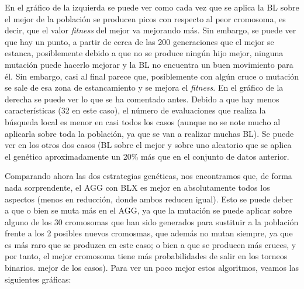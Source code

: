 \documentclass[11pt,a4paper]{article}
\begin{document}
En el gráfico de la izquierda se puede ver como cada vez que se aplica la BL sobre el mejor de la población se producen picos
con respecto al peor cromosoma, es decir, que el valor \textit{fitness} del mejor va mejorando más. Sin embargo, se puede ver
que hay un punto, a partir de cerca de las 200 generaciones que el mejor se estanca, posiblemente debido a que no se produce
ningún hijo mejor, ninguna mutación puede hacerlo mejorar y la BL no encuentra un buen movimiento para él. Sin embargo, casi al
final parece que, posiblemente con algún cruce o mutación se sale de esa zona de estancamiento y se mejora el \textit{fitness}.
En el gráfico de la derecha se puede ver lo que se ha comentado antes. Debido a que hay menos características (32 en este caso),
el número de evaluaciones que realiza la búsqueda local es menor en casi todos los casos (aunque no se note mucho al aplicarla
sobre toda la población, ya que se van a realizar muchas BL). Se puede ver en los otros dos casos (BL sobre el mejor y sobre uno
aleatorio que se aplica el genético aproximadamente un 20\% más que en el conjunto de datos anterior.

Comparando ahora las dos estrategias genéticas, nos encontramos que, de forma nada sorprendente, el AGG con BLX es mejor en
absolutamente todos los aspectos (menos en reducción, donde ambos reducen igual). Esto se puede deber a que o bien se muta más en
el AGG, ya que la mutación se puede aplicar sobre alguno de los 30 cromosomas que han sido generados para sustituir a la población
frente a los 2 posibles nuevos cromosmas, que además no mutan siempre, ya que es más raro que se produzca en este caso; o bien a
que se producen más cruces, y por tanto, el mejor cromosoma tiene más probabilidades de salir en los torneos binarios.
mejor de los casos). Para ver un poco mejor estos algoritmos, veamos las siguientes gráficas:
\end{document}
